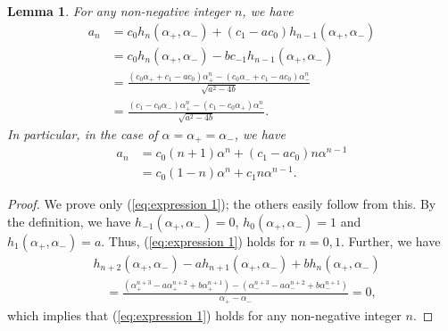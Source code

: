 \documentclass[a4paper,11pt,reqno]{amsart}
\theoremstyle{plain}
\newtheorem{lem}[thm]{Lemma}
\theoremstyle{definition}
\begin{document}
\begin{lem}
For any non-negative integer $n$, we have 
\begin{align}
\label{eq:expression 1}
a_{n}
   &=
   c_{0}h_{n}(\alpha _{+},\alpha _{-})+(c_{1}-ac_{0})h_{n-1}(\alpha _{+},\alpha _{-}) \\
  \nonumber
   &=
   c_{0}h_{n}(\alpha _{+},\alpha _{-})-bc_{-1}h_{n-1}(\alpha _{+},\alpha _{-}) \\
  \nonumber
   &=
   \frac{(c_{0}\alpha _{+}+c_{1}-ac_{0})\alpha _{+}^{n}-(c_{0}\alpha _{-}+c_{1}-ac_{0})\alpha _{-}^{n}}{\sqrt{a^{2}-4b}} \\
\label{eq:expression 1 final}
   &=
   \frac{(c_{1}-c_{0}\alpha _{-})\alpha _{+}^{n}-(c_{1}-c_{0}\alpha _{+})\alpha _{-}^{n}}{\sqrt{a^{2}-4b}}.
\end{align}
In particular, in the case of $\alpha =\alpha _{+}=\alpha _{-}$, we have 
\begin{align}
\label{eq:expression 1-1}
a_{n}
   &=
   c_{0}(n+1)\alpha ^{n}+(c_{1}-ac_{0})n\alpha ^{n-1} \\
\nonumber
   &=
   c_{0}(1-n)\alpha ^{n}+c_{1}n\alpha ^{n-1}.
\end{align}
\end{lem}
\begin{proof}
We prove only (\ref{eq:expression 1}); the others easily follow from this. 
By the definition, we have $h_{-1}(\alpha _{+},\alpha _{-})=0$, 
$h_{0}(\alpha _{+},\alpha _{-})=1$ and $h_{1}(\alpha _{+},\alpha _{-})=a$. 
Thus, (\ref{eq:expression 1}) holds for $n=0,1$. 
Further, we have 
\begin{align*}
& h_{n+2}(\alpha _{+},\alpha _{-})-ah_{n+1}(\alpha _{+},\alpha _{-})+bh_{n}(\alpha _{+},\alpha _{-}) \\
   & \quad =
   \frac{(\alpha _{+}^{n+3}-a\alpha _{+}^{n+2}+b\alpha _{+}^{n+1})-(\alpha _{-}^{n+3}-a\alpha _{-}^{n+2}+b\alpha _{-}^{n+1})}{\alpha _{+}-\alpha _{-}}
   =0 ,
\end{align*}
which implies that (\ref{eq:expression 1}) holds for any non-negative integer $n$. 
\end{proof}
\end{document}
